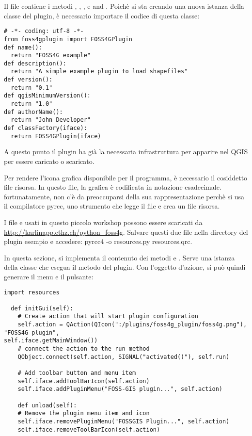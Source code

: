 Il file  contiene i metodi ,
, , 
e  and . Poichè si sta creando una nuova istanza della classe del plugin, è necessario importare il codice di questa classe:

\begin{verbatim}
# -*- coding: utf-8 -*-
from foss4gplugin import FOSS4GPlugin
def name():
  return "FOSS4G example"
def description():
  return "A simple example plugin to load shapefiles"
def version():
  return "0.1"
def qgisMinimumVersion():
  return "1.0"
def authorName():
  return "John Developer"
def classFactory(iface):
  return FOSS4GPlugin(iface)
\end{verbatim}

A questo punto il plugin ha già la necessaria infrastruttura per apparire nel QGIS  per essere caricato o scaricato.


Per rendere l'icona grafica disponibile per il programma, è necessario il cosiddetto file risorsa. In questo file, la grafica è codificata in notazione esadecimale. fortunatamente, non c'è da preoccuparsi della sua rappresentazione perchè si usa il compilatore pyrcc, uno strumento che legge il file  e crea un file risorsa.

I file  e  usati in questo piccolo workshop possono essere scaricati da
\url{http://karlinapp.ethz.ch/python\_foss4g}. Salvare questi due file nella directory del plugin esempio
 e accedere: pyrcc4 -o
resources.py resources.qrc.


In questa sezione, si implementa il contenuto dei metodi  e
. Serve una istanza della classe  che esegua il
 metodo del plugin. Con l'oggetto d'azione, si può quindi generare il menu e il pulsante:

\begin{verbatim}
import resources

  def initGui(self):
    # Create action that will start plugin configuration
    self.action = QAction(QIcon(":/plugins/foss4g_plugin/foss4g.png"), "FOSS4G plugin",
self.iface.getMainWindow())
    # connect the action to the run method
    QObject.connect(self.action, SIGNAL("activated()"), self.run)

    # Add toolbar button and menu item
    self.iface.addToolBarIcon(self.action)
    self.iface.addPluginMenu("FOSS-GIS plugin...", self.action)

    def unload(self):
    # Remove the plugin menu item and icon
    self.iface.removePluginMenu("FOSSGIS Plugin...", self.action)
    self.iface.removeToolBarIcon(self.action)
\end{verbatim}

